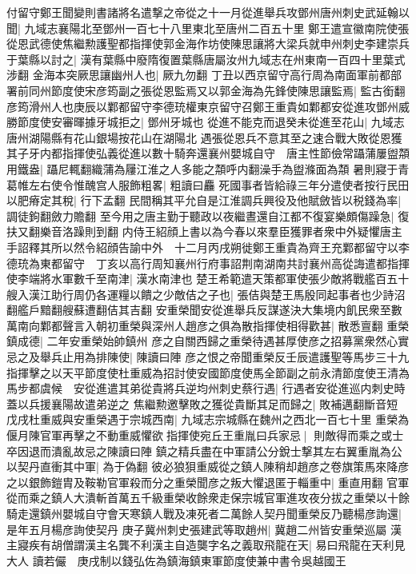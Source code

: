 付留守鄭王聞變則書諸將名遣撃之帝從之十一月從進舉兵攻鄧州唐州刺史武延翰以聞|{
	九域志襄陽北至鄧州一百七十八里東北至唐州二百五十里}
鄭王遣宣徽南院使張從恩武德使焦繼勲護聖都指揮使郭金海作坊使陳思讓將大梁兵就申州刺史李建崇兵于葉縣以討之|{
	漢有葉縣中廢隋復置葉縣唐屬汝州九域志在州東南一百四十里葉式涉翻}
金海本突厥思讓幽州人也|{
	厥九勿翻}
丁丑以西京留守高行周為南面軍前都部署前同州節度使宋彦筠副之張從恩監焉又以郭金海為先鋒使陳思讓監焉|{
	監古銜翻}
彦筠滑州人也庚辰以鄴都留守李德珫權東京留守召鄭王重貴如鄴都安從進攻鄧州威勝節度使安審暉據牙城拒之|{
	鄧州牙城也}
從進不能克而退癸未從進至花山|{
	九域志唐州湖陽縣有花山銀場按花山在湖陽北}
遇張從恩兵不意其至之速合戰大敗從恩獲其子牙内都指揮使弘義從進以數十騎奔還襄州嬰城自守　唐主性節儉常躡蒲屢盥頮用鐵盎|{
	躡尼輒翻織蒲為屨江淮之人多能之頮呼内翻澡手為盥滌面為頮}
暑則寢于青葛帷左右使令惟醜宫人服飾粗畧|{
	粗讀曰麤}
死國事者皆給祿三年分遣使者按行民田以肥瘠定其稅|{
	行下孟翻}
民間稱其平允自是江淮調兵興役及他賦斂皆以税錢為率|{
	調徒鉤翻斂力贍翻}
至今用之唐主勤于聽政以夜繼晝還自江都不復宴樂頗傷躁急|{
	復扶又翻樂音洛躁則到翻}
内侍王紹顔上書以為今春以來羣臣獲罪者衆中外疑懼唐主手詔釋其所以然令紹顔告諭中外　十二月丙戌朔徙鄭王重貴為齊王充鄴都留守以李德珫為東都留守　丁亥以高行周知襄州行府事詔荆南湖南共討襄州高從誨遣都指揮使李端將水軍數千至南津|{
	漢水南津也}
楚王希範遣天策都軍使張少敵將戰艦百五十艘入漢江助行周仍各運糧以饋之少敵佶之子也|{
	張佶與楚王馬殷同起事者也少詩沼翻艦戶黯翻艘蘇遭翻佶其吉翻}
安重榮聞安從進舉兵反謀遂決大集境内飢民衆至數萬南向鄴都聲言入朝初重榮與深州人趙彦之俱為散指揮使相得歡甚|{
	散悉亶翻}
重榮鎮成德|{
	二年安重榮始帥鎮州}
彦之自關西歸之重榮待遇甚厚使彦之招募黨衆然心實忌之及舉兵止用為排陳使|{
	陳讀曰陣}
彦之恨之帝聞重榮反壬辰遣護聖等馬步三十九指揮擊之以天平節度使杜重威為招討使安國節度使馬全節副之前永清節度使王清為馬步都虞候　安從進遣其弟從貴將兵逆均州刺史蔡行遇|{
	行遇者安從進巡内刺史時蓋以兵援襄陽故遣弟逆之}
焦繼勲邀擊敗之獲從貴斷其足而歸之|{
	敗補邁翻斷音短}
戊戌杜重威與安重榮遇于宗城西南|{
	九域志宗城縣在魏州之西北一百七十里}
重榮為偃月陳官軍再擊之不動重威懼欲指揮使宛丘王重胤曰兵家忌|{
	則敵得而乘之或士卒因退而潰亂故忌之陳讀曰陣}
鎮之精兵盡在中軍請公分銳士撃其左右翼重胤為公以契丹直衝其中軍|{
	為于偽翻}
彼必狼狽重威從之鎮人陳稍却趙彦之卷旗策馬來降彦之以銀飾鎧胄及鞍勒官軍殺而分之重榮聞彦之叛大懼退匿于輜重中|{
	重直用翻}
官軍從而乘之鎮人大潰斬首萬五千級重榮收餘衆走保宗城官軍進攻夜分拔之重榮以十餘騎走還鎮州嬰城自守會天寒鎮人戰及凍死者二萬餘人契丹聞重榮反乃聽楊彦詢還|{
	是年五月楊彦詢使契丹}
庚子冀州刺史張建武等取趙州|{
	冀趙二州皆安重榮巡屬}
漢主寢疾有胡僧謂漢主名龔不利漢主自造龑字名之義取飛龍在天|{
	易曰飛龍在天利見大人}
讀若儼　庚戌制以錢弘佐為鎮海鎮東軍節度使兼中書令吳越國王

